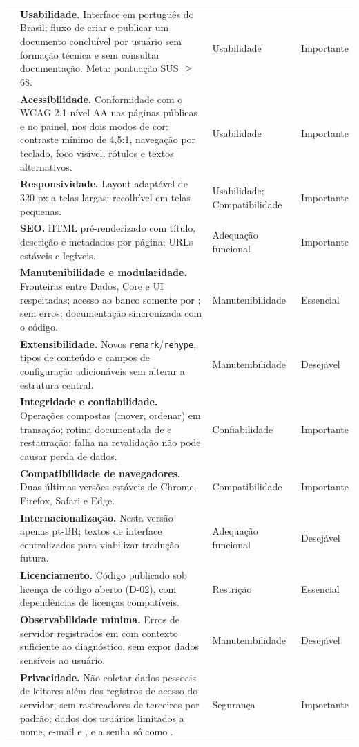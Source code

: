 \begin{longtable}{@{}L{1.4cm}L{7.6cm}L{2.7cm}L{1.9cm}@{}}
 & \textbf{Usabilidade.} Interface em português do Brasil; fluxo de criar e publicar um documento concluível por usuário sem formação técnica e sem consultar documentação. Meta: pontuação SUS $\geq$ 68. & Usabilidade & Importante\\[1pt]
 & \textbf{Acessibilidade.} Conformidade com o WCAG 2.1 nível AA \cite{wcag21} nas páginas públicas e no painel, nos dois modos de cor: contraste mínimo de 4,5:1, navegação por teclado, foco visível, rótulos e textos alternativos. & Usabilidade & Importante\\[1pt]
 & \textbf{Responsividade.} Layout adaptável de 320 px a telas largas;  recolhível em telas pequenas. & Usabilidade; Compatibilidade & Importante\\[1pt]
 & \textbf{SEO.} HTML pré-renderizado com título, descrição e metadados por página; URLs estáveis e legíveis. & Adequação funcional & Importante\\[1pt]
 & \textbf{Manutenibilidade e modularidade.} Fronteiras entre Dados, Core e UI respeitadas; acesso ao banco somente por ;  sem erros; documentação sincronizada com o código. & Manutenibilidade & Essencial\\[1pt]
 & \textbf{Extensibilidade.} Novos  \texttt{remark}/\texttt{rehype}, tipos de conteúdo e campos de configuração adicionáveis sem alterar a estrutura central. & Manutenibilidade & Desejável\\[1pt]
 & \textbf{Integridade e confiabilidade.} Operações compostas (mover, ordenar) em transação; rotina documentada de  e restauração; falha na revalidação não pode causar perda de dados. & Confiabilidade & Importante\\[1pt]
 & \textbf{Compatibilidade de navegadores.} Duas últimas versões estáveis de Chrome, Firefox, Safari e Edge. & Compatibilidade & Importante\\[1pt]
 & \textbf{Internacionalização.} Nesta versão apenas pt-BR; textos de interface centralizados para viabilizar tradução futura. & Adequação funcional & Desejável\\[1pt]
 & \textbf{Licenciamento.} Código publicado sob licença de código aberto (D-02), com dependências de licenças compatíveis. & Restrição & Essencial\\[1pt]
 & \textbf{Observabilidade mínima.} Erros de servidor registrados em  com contexto suficiente ao diagnóstico, sem expor dados sensíveis ao usuário. & Manutenibilidade & Desejável\\[1pt]
 & \textbf{Privacidade.} Não coletar dados pessoais de leitores além dos registros de acesso do servidor; sem rastreadores de terceiros por padrão; dados dos usuários limitados a nome, e-mail e , e a senha só como . & Segurança & Importante\\[1pt]
\end{longtable}


